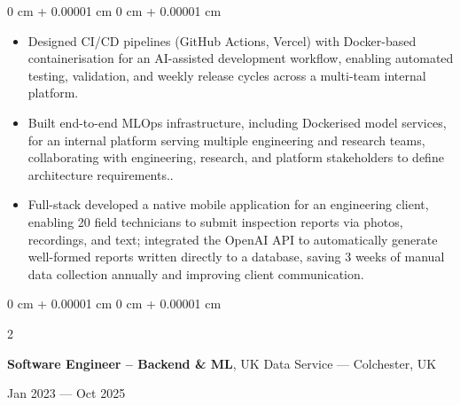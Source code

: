 \documentclass[6pt, letterpaper]{article}
\newenvironment{highlights}{
    \begin{itemize}[
        topsep=0.02 cm,
        parsep=0.02 cm,
        partopsep=0pt,
        itemsep=0pt,
        leftmargin=0 cm + 8pt
    ]
}{
    \end{itemize}
} %
\newenvironment{onecolentry}{
    \begin{adjustwidth}{
        0 cm + 0.00001 cm
    }{
        0 cm + 0.00001 cm
    }
}{
    \end{adjustwidth}
} %
\newenvironment{twocolentry}[2][]{
    \onecolentry
    \def\secondColumn{#2}
    \setcolumnwidth{\fill, 4.5 cm}
    \begin{paracol}{2}
}{
    \switchcolumn \raggedleft \secondColumn
    \end{paracol}
    \endonecolentry
} %
\begin{document}
        \begin{onecolentry}
        \begin{highlights}

            \item Designed CI/CD pipelines (GitHub Actions, Vercel) with Docker-based containerisation for an AI-assisted development workflow, enabling automated testing, validation, and weekly release cycles across a multi-team internal platform.
            \item Built end-to-end MLOps infrastructure, including Dockerised model services, for an internal platform serving multiple engineering and research teams, collaborating with engineering, research, and platform stakeholders to define architecture requirements..
            \item Full-stack developed a native mobile application for an engineering client, enabling 20 field technicians to submit inspection reports via photos, recordings, and text; integrated the OpenAI API to automatically generate well-formed reports written directly to a database, saving 3 weeks of manual data collection annually and improving client communication.

        \end{highlights}
        \end{onecolentry}

        \begin{twocolentry}{Jan 2023 --- Oct 2025}
            \textbf{Software Engineer – Backend \& ML}, UK Data Service --- Colchester, UK
        \end{twocolentry}
\end{document}
